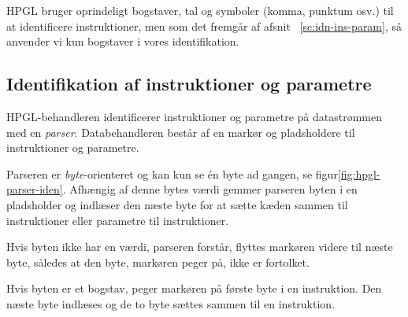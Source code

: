 HPGL bruger oprindeligt bogstaver, tal og symboler (komma, punktum
osv.) til at identificere instruktioner, men som det fremgår af afsnit
~\vref{sc:idn-ins-param}, så anvender vi kun bogstaver i vores
identifikation.


\subsection{Identifikation af instruktioner og parametre}
\label{sc:idn-ins-param}


HPGL-behandleren identificerer instruktioner og parametre på
datastrømmen med en \textit{parser}. Databehandleren består af en
markør og pladsholdere til instruktioner og parametre.

Parseren er \textit{byte}-orienteret og kan kun se én byte ad gangen,
se figur\vref{fig:hpgl-parser-iden}. Afhængig af denne bytes værdi
gemmer parseren byten i en pladsholder og indlæser den næste byte for
at sætte kæden sammen til instruktioner eller parametre til
instruktioner.


Hvis byten ikke har en værdi, parseren forstår, flyttes markøren
videre til næste byte, således at den byte, markøren peger på, ikke er
fortolket.

Hvis byten er et bogstav, peger markøren på første byte i en
instruktion. Den næste byte indlæses og de to byte sættes sammen til
en instruktion.

